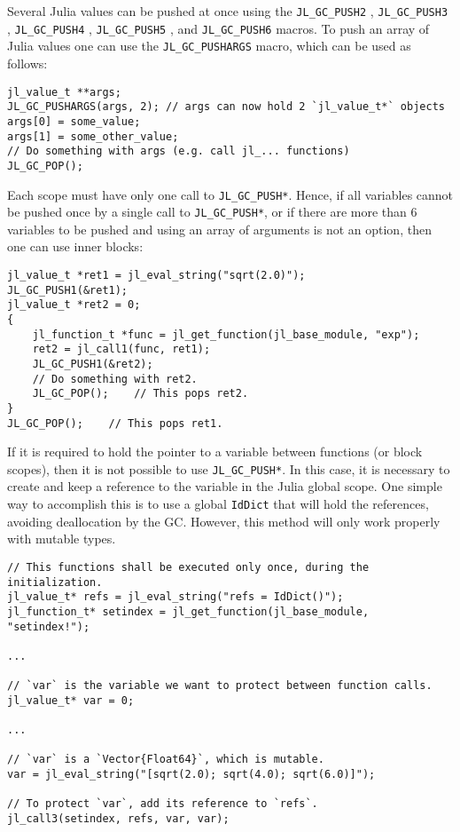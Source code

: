Several Julia values can be pushed at once using the \texttt{JL\_GC\_PUSH2} , \texttt{JL\_GC\_PUSH3} , \texttt{JL\_GC\_PUSH4} , \texttt{JL\_GC\_PUSH5} , and \texttt{JL\_GC\_PUSH6} macros. To push an array of Julia values one can use the \texttt{JL\_GC\_PUSHARGS} macro, which can be used as follows:




\begin{lstlisting}
jl_value_t **args;
JL_GC_PUSHARGS(args, 2); // args can now hold 2 `jl_value_t*` objects
args[0] = some_value;
args[1] = some_other_value;
// Do something with args (e.g. call jl_... functions)
JL_GC_POP();
\end{lstlisting}



Each scope must have only one call to \texttt{JL\_GC\_PUSH*}. Hence, if all variables cannot be pushed once by a single call to \texttt{JL\_GC\_PUSH*}, or if there are more than 6 variables to be pushed and using an array of arguments is not an option, then one can use inner blocks:




\begin{lstlisting}
jl_value_t *ret1 = jl_eval_string("sqrt(2.0)");
JL_GC_PUSH1(&ret1);
jl_value_t *ret2 = 0;
{
    jl_function_t *func = jl_get_function(jl_base_module, "exp");
    ret2 = jl_call1(func, ret1);
    JL_GC_PUSH1(&ret2);
    // Do something with ret2.
    JL_GC_POP();    // This pops ret2.
}
JL_GC_POP();    // This pops ret1.
\end{lstlisting}



If it is required to hold the pointer to a variable between functions (or block scopes), then it is not possible to use \texttt{JL\_GC\_PUSH*}. In this case, it is necessary to create and keep a reference to the variable in the Julia global scope. One simple way to accomplish this is to use a global \texttt{IdDict} that will hold the references, avoiding deallocation by the GC. However, this method will only work properly with mutable types.




\begin{lstlisting}
// This functions shall be executed only once, during the initialization.
jl_value_t* refs = jl_eval_string("refs = IdDict()");
jl_function_t* setindex = jl_get_function(jl_base_module, "setindex!");

...

// `var` is the variable we want to protect between function calls.
jl_value_t* var = 0;

...

// `var` is a `Vector{Float64}`, which is mutable.
var = jl_eval_string("[sqrt(2.0); sqrt(4.0); sqrt(6.0)]");

// To protect `var`, add its reference to `refs`.
jl_call3(setindex, refs, var, var);
\end{lstlisting}



